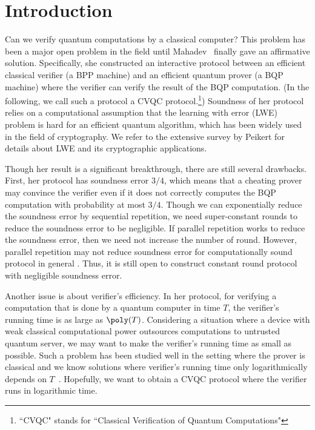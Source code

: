 \section{Introduction}
Can we verify quantum computations by a classical computer? This problem has been a major open problem in the field until Mahadev~\cite{FOCS:Mahadev18a} finally gave an affirmative solution.
Specifically, she constructed an interactive protocol between an efficient classical verifier (a BPP machine) and an efficient quantum prover (a BQP machine) where the verifier can verify the result of the BQP computation.
(In the following, we call such a protocol a CVQC protocol.\footnote{``CVQC" stands for ``Classical Verification of Quantum Computations"}) 
Soundness of her protocol relies on a computational assumption that the learning with error (LWE) problem \cite{JACM:Regev09} is hard for an efficient quantum algorithm, which has been widely used in the field of cryptography. We refer to the extensive survey by Peikert \cite{FTTCS:Peikert16} for details about LWE and its cryptographic applications.

Though her result is a significant breakthrough, there are still several drawbacks. First, her protocol has soundness error $3/4$, which means that a cheating prover may convince the verifier even if it does not correctly computes the BQP computation with probability at most $3/4$. Though we can exponentially reduce the soundness error by sequential repetition, we need super-constant rounds to reduce the soundness error to be negligible.
If parallel repetition works to reduce the soundness error, then we need not increase the number of round.
However, parallel repetition may not reduce soundness error for computationally sound protocol in general \cite{FOCS:BelImpNao97,TCC:PieWik07}.
Thus, it is still open to construct constant round protocol with negligible soundness error.

Another issue is about verifier's efficiency. In her protocol, for verifying a computation that is done by a quantum computer in time $T$, the verifier's running time is as large as $\poly(T)$.
Considering a situation where a device with weak classical computational power outsources computations to untrusted quantum server, we may want to make the verifier's running time as small as possible.
Such a problem has been studied well in the setting where the prover is classical and we know solutions where verifier's running time only logarithmically depends on $T$~\cite{STOC:Kilian92,SIAM:Micali00,STOC:KalRazRot13,STOC:KalRazRot14,JACM:GolKalRot15,STOC:ReiRotRot16,STOC:BraHolKal17,STOC:BKKSW18,FOCS:HolRot18,STOC:CCHLRRW19,STOC:KalPanYan19}.
Hopefully, we want to obtain a CVQC protocol where the verifier runs in logarithmic time.  

